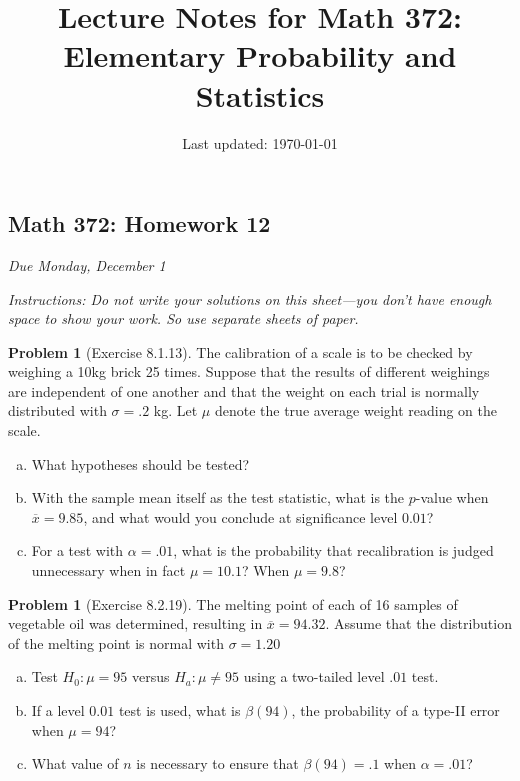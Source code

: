 \documentclass[10pt]{article}
\title{Lecture Notes for Math 372: \\Elementary Probability and Statistics}
\date{Last updated: \today}
\theoremstyle{definition}
\newtheorem{problem}[theorem]{Problem}
\newcommand{\1}[1]{\textbf{1}_{\left[#1\right]}} %
\begin{document}
\begin{center}
  \section*{Math 372: Homework 12}
  \textit{Due Monday, December 1}
\end{center}

\textit{Instructions: Do not write your solutions on this sheet---you don't have enough space to show
your work. So use separate sheets of paper.}


\begin{problem}[Exercise 8.1.13]
  The calibration of a scale is to be checked by weighing a 10kg brick 25
  times. Suppose that the results of different weighings are independent of
  one another and that the weight on each trial is normally distributed with
  $\sigma=.2$ kg. Let $\mu$ denote the true average weight reading on the
  scale.
  \begin{enumerate}[(a)]
    \item What hypotheses should be tested?
    \item With the sample mean itself as the test statistic, what is the
    $p$-value when $\overline{x}=9.85$, and what would you conclude at
    significance level $0.01$?
    \item For a test with $\alpha=.01$, what is the probability that
    recalibration is judged unnecessary when in fact $\mu=10.1$? When
    $\mu=9.8$?
  \end{enumerate}
\end{problem}

\begin{problem}[Exercise 8.2.19]
  The melting point of each of 16 samples of vegetable oil was determined,
  resulting in $\overline{x}=94.32$. Assume that the distribution of the
  melting point is normal with $\sigma=1.20$
  \begin{enumerate}[(a)]
    \item Test $H_{0}:\mu=95$ versus $H_{a}:\mu\neq 95$ using a two-tailed
    level $.01$ test.
    \item If a level $0.01$ test is used, what is $\beta(94)$, the probability
    of a type-II error when $\mu=94$?
    \item What value of $n$ is necessary to ensure that $\beta(94)=.1$ when $\alpha=.01$?
  \end{enumerate}
\end{problem}
\end{document}
